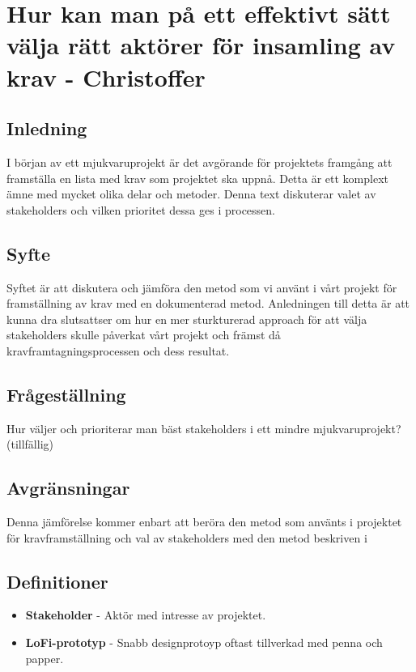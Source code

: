 \chapter{Hur kan man på ett effektivt sätt välja rätt aktörer för insamling av krav - Christoffer}

\section{Inledning}
I början av ett mjukvaruprojekt är det avgörande för projektets framgång att framställa en lista med krav som projektet ska uppnå. Detta är ett komplext ämne med mycket olika delar och metoder. Denna text diskuterar valet av stakeholders och vilken prioritet dessa ges i processen.

\section{Syfte}
Syftet är att diskutera och jämföra den metod som vi använt i vårt projekt för framställning av krav med en dokumenterad metod. Anledningen till detta är att kunna dra slutsattser om hur en mer sturkturerad approach för att välja stakeholders skulle påverkat vårt projekt och främst då kravframtagningsprocessen och dess resultat.

\section{Frågeställning}
Hur väljer och prioriterar man bäst stakeholders i ett mindre mjukvaruprojekt? (tillfällig)

\section{Avgränsningar}
Denna jämförelse kommer enbart att beröra den metod som använts i projektet för kravframställning och val av stakeholders med den metod beskriven i  

\section{Definitioner}
\begin{itemize}
	\item \textbf{Stakeholder} - Aktör med intresse av projektet.
	\item \textbf{LoFi-prototyp} - Snabb designprotoyp oftast tillverkad med penna och papper.
\end{itemize}



